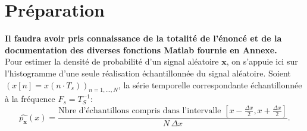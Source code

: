 \documentclass{article}
\begin{document}
\vspace*{5mm}
\section{Préparation}

\textbf{Il faudra avoir pris connaissance de la totalité de l'énoncé et de la documentation des diverses fonctions Matlab fournie en Annexe.}\\

Pour estimer la densité de probabilité d'un signal aléatoire $\mathbf{x}$, on s'appuie ici sur l'histogramme d'une seule réalisation échantillonnée du signal aléatoire. Soient $\left(x[n] = x(n\cdot T_s) \right)_{n=1,\ldots,N}$, la série temporelle correspondante échantillonnée à la fréquence $F_s = T_S^{-1}$:
$$
\widehat{p_{\mathbf{x}}}(x) = \frac{\mbox{Nbre d'échantillons compris dans l'intervalle } \left[ x-\frac{\Delta x}{2},x+\frac{\Delta x}{2}\right]}{N\,\Delta x}.
$$
\end{document}
